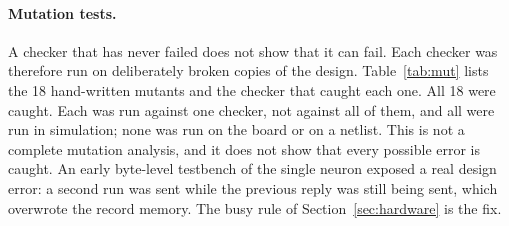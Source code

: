 \documentclass[11pt]{article}
\begin{document}
\paragraph{Mutation tests.}
A checker that has never failed does not show that it can fail.
Each checker was therefore run on deliberately broken copies of the design. Table~\ref{tab:mut} lists the 18 hand-written mutants and the checker that caught each one. All 18 were caught. Each was run against one checker, not against all of them, and all were run in simulation; none was run on the board or on a netlist.
This is not a complete mutation analysis, and it does not show that every possible error is caught.
An early byte-level testbench of the single neuron exposed a real design error: a second run was sent while the previous reply was still being sent, which overwrote the record memory. The busy rule of Section~\ref{sec:hardware} is the fix.
\end{document}
